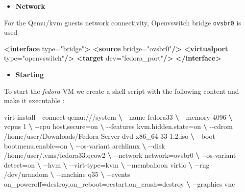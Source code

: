 \documentclass[
  14pt,
  english,
  a4paper,
]{scrreprt}
\newenvironment{Shaded}{}{}
\newcommand{\ExtensionTok}[1]{#1}
\newcommand{\KeywordTok}[1]{\textcolor[rgb]{0.00,0.44,0.13}{\textbf{#1}}}
\newcommand{\NormalTok}[1]{#1}
\newcommand{\OtherTok}[1]{\textcolor[rgb]{0.00,0.44,0.13}{#1}}
\newcommand{\StringTok}[1]{\textcolor[rgb]{0.25,0.44,0.63}{#1}}
\providecommand{\tightlist}{%
  \setlength{\itemsep}{0pt}\setlength{\parskip}{0pt}}
\begin{document}
\begin{itemize}
\tightlist
\item
  \textbf{Network}
\end{itemize}

For the Qemu/kvm guests network connectivity, Openvswitch bridge
\texttt{ovsbr0} is used

\begin{Shaded}
\begin{Highlighting}[]
\KeywordTok{\textless{}interface}\OtherTok{ type=}\StringTok{"bridge"}\KeywordTok{\textgreater{}}
  \KeywordTok{\textless{}source}\OtherTok{ bridge=}\StringTok{"ovsbr0"}\KeywordTok{/\textgreater{}}
  \KeywordTok{\textless{}virtualport}\OtherTok{ type=}\StringTok{"openvswitch"}\KeywordTok{/\textgreater{}}
  \KeywordTok{\textless{}target}\OtherTok{ dev=}\StringTok{"fedora\_port"}\KeywordTok{/\textgreater{}}
\KeywordTok{\textless{}/interface\textgreater{}}
\end{Highlighting}
\end{Shaded}

\begin{itemize}
\tightlist
\item
  \textbf{Starting}
\end{itemize}

To start the \emph{fedora} VM we create a shell script with the
following content and make it executable :

\begin{Shaded}
\begin{Highlighting}[]
 \ExtensionTok{virt{-}install}\NormalTok{ {-}{-}connect qemu:///system }\KeywordTok{\textbackslash{}}
  \ExtensionTok{{-}{-}name}\NormalTok{ fedora33 }\KeywordTok{\textbackslash{}}
  \ExtensionTok{{-}{-}memory}\NormalTok{ 4096 }\KeywordTok{\textbackslash{}}
  \ExtensionTok{{-}{-}vcpus}\NormalTok{ 1 }\KeywordTok{\textbackslash{}}
  \ExtensionTok{{-}{-}cpu}\NormalTok{ host,secure=on }\KeywordTok{\textbackslash{}}
  \ExtensionTok{{-}{-}features}\NormalTok{ kvm.hidden.state=on }\KeywordTok{\textbackslash{}}
  \ExtensionTok{{-}{-}cdrom}\NormalTok{ /home/user/Downloads/Fedora{-}Server{-}dvd{-}x86\_64{-}33{-}1.2.iso }\KeywordTok{\textbackslash{}}
  \ExtensionTok{{-}{-}boot}\NormalTok{ bootmenu.enable=on }\KeywordTok{\textbackslash{}}
  \ExtensionTok{{-}{-}os{-}variant}\NormalTok{ archlinux }\KeywordTok{\textbackslash{}}
  \ExtensionTok{{-}{-}disk}\NormalTok{ /home/user/.vms/fedora33.qcow2 }\KeywordTok{\textbackslash{}}
  \ExtensionTok{{-}{-}network}\NormalTok{ network=ovsbr0 }\KeywordTok{\textbackslash{}}
  \ExtensionTok{{-}{-}os{-}variant}\NormalTok{ detect=on }\KeywordTok{\textbackslash{}}
  \ExtensionTok{{-}{-}hvm} \KeywordTok{\textbackslash{}}
  \ExtensionTok{{-}{-}virt{-}type}\NormalTok{=kvm }\KeywordTok{\textbackslash{}}
  \ExtensionTok{{-}{-}memballoon}\NormalTok{ virtio }\KeywordTok{\textbackslash{}}
  \ExtensionTok{{-}{-}rng}\NormalTok{ /dev/urandom }\KeywordTok{\textbackslash{}}
  \ExtensionTok{{-}{-}machine}\NormalTok{ q35 }\KeywordTok{\textbackslash{}}
  \ExtensionTok{{-}{-}events}\NormalTok{ on\_poweroff=destroy,on\_reboot=restart,on\_crash=destroy }\KeywordTok{\textbackslash{}}
  \ExtensionTok{{-}{-}graphics}\NormalTok{ vnc}
\end{Highlighting}
\end{Shaded}
\end{document}
